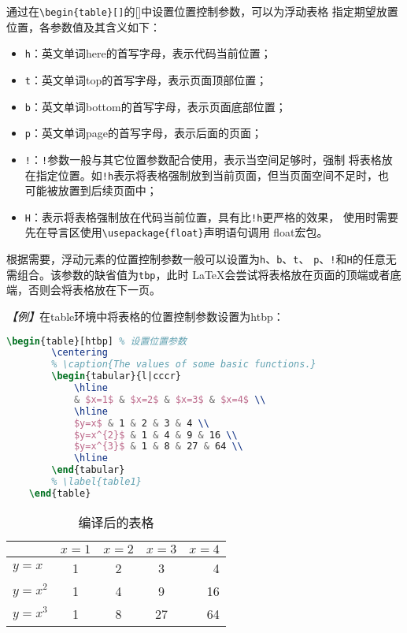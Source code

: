 通过在\texttt{\textbackslash{}begin\{table\}[]}的[]中设置位置控制参数，可以为浮动表格
指定期望放置位置，各参数值及其含义如下：
\begin{itemize}
    \item \texttt{h}：英文单词here的首写字母，表示代码当前位置；
    \item \texttt{t}：英文单词top的首写字母，表示页面顶部位置；
    \item \texttt{b}：英文单词bottom的首写字母，表示页面底部位置；
    \item \texttt{p}：英文单词page的首写字母，表示后面的页面；
    \item \texttt{!}：\texttt{!}参数一般与其它位置参数配合使用，表示当空间足够时，强制
          将表格放在指定位置。如\texttt{!h}表示将表格强制放到当前页面，但当页面空间不足时，也
          可能被放置到后续页面中；
    \item \texttt{H}：表示将表格强制放在代码当前位置，具有比\texttt{!h}更严格的效果，
          使用时需要先在导言区使用\texttt{\textbackslash{}usepackage\{float\}}声明语句调用
          float宏包。
\end{itemize}

根据需要，浮动元素的位置控制参数一般可以设置为\texttt{h}、\texttt{b}、\texttt{t}、
\texttt{p}、\texttt{!}和\texttt{H}的任意无需组合。该参数的缺省值为\texttt{tbp}，此时
LaTeX会尝试将表格放在页面的顶端或者底端，否则会将表格放在下一页。

\emph{【例】}在table环境中将表格的位置控制参数设置为htbp：
\begin{lstlisting}[language=TeX]
    \begin{table}[htbp] % 设置位置参数
        \centering
        % \caption{The values of some basic functions.}
        \begin{tabular}{l|cccr}
            \hline
            & $x=1$ & $x=2$ & $x=3$ & $x=4$ \\
            \hline
            $y=x$ & 1 & 2 & 3 & 4 \\
            $y=x^{2}$ & 1 & 4 & 9 & 16 \\
            $y=x^{3}$ & 1 & 8 & 27 & 64 \\
            \hline
        \end{tabular}
        % \label{table1}
    \end{table}
\end{lstlisting}

\begin{table}[htbp] %
    \centering
    \begin{tabular}{l|cccr}
        \hline
                  & $x=1$ & $x=2$ & $x=3$ & $x=4$ \\
        \hline
        $y=x$     & 1     & 2     & 3     & 4     \\
        $y=x^{2}$ & 1     & 4     & 9     & 16    \\
        $y=x^{3}$ & 1     & 8     & 27    & 64    \\
        \hline
    \end{tabular}
    \caption{编译后的表格}
    \label{tb3}
\end{table}


